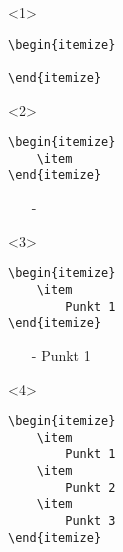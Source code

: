 \documentclass["WS\space 16-17\space -\space LaTeX-Kurs\space -\space Praesentation\space -\space 2.tex"]{subfiles}
\begin{document}
\begin{frame}[fragile]
	\begin{onlyenv}
		\Code
		\begin{lstlisting}
\begin{itemize}

\end{itemize}
		\end{lstlisting}
	\end{onlyenv}
	\begin{onlyenv}
		\Code
		\begin{lstlisting}
\begin{itemize}
	\item
\end{itemize}
		\end{lstlisting}
		
		\Ausgabe
		\begin{outputbox}
			\begin{itemize}
				\item[-]
			\end{itemize}
		\end{outputbox}
	\end{onlyenv}
	\begin{onlyenv}
		\Code
		\begin{lstlisting}
\begin{itemize}
	\item
		Punkt 1
\end{itemize}
		\end{lstlisting}
		
		\Ausgabe
		\begin{outputbox}
			\begin{itemize}
				\item[-]
					Punkt 1
			\end{itemize}
		\end{outputbox}
	\end{onlyenv}
	\begin{onlyenv}
		\Code
		\begin{lstlisting}
\begin{itemize}
	\item
		Punkt 1
	\item
		Punkt 2
	\item
		Punkt 3
\end{itemize}
		\end{lstlisting}
		

\end{onlyenv}
\end{frame}
\end{document}
